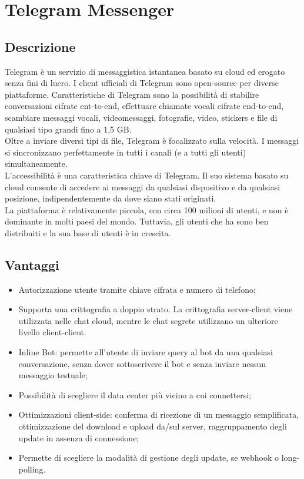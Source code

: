 \documentclass[11pt,notitlepage]{article}
\begin{document}
\bigskip
\section*{Telegram Messenger}
\subsection*{Descrizione}
Telegram è un servizio di messaggistica istantanea basato su cloud ed erogato senza fini di lucro. I client ufficiali di Telegram sono open-source per diverse piattaforme. Caratteristiche di Telegram sono la possibilità di stabilire conversazioni cifrate ent-to-end, effettuare chiamate vocali cifrate end-to-end, scambiare messaggi vocali, videomessaggi, fotografie, video, stickers e file di qualsiasi tipo grandi fino a 1,5 GB.  \\
Oltre a inviare diversi tipi di file, Telegram è focalizzato sulla velocità. I messaggi si sincronizzano perfettamente in tutti i canali (e a tutti gli utenti) simultaneamente. \\
L'accessibilità è una caratteristica chiave di Telegram. Il suo sistema basato su cloud consente di accedere ai messaggi da qualsiasi dispositivo e da qualsiasi posizione, indipendentemente da dove siano stati originati. \\
La piattaforma è relativamente piccola, con circa 100 milioni di utenti, e non è dominante in molti paesi del mondo. Tuttavia, gli utenti che ha sono ben distribuiti e la sua base di utenti è in crescita.

\subsection*{Vantaggi}
\begin{itemize}
		\item Autorizzazione utente tramite chiave cifrata e numero di telefono;
		\item Supporta una crittografia a doppio strato. La crittografia server-client viene utilizzata nelle chat cloud, mentre le chat segrete utilizzano un ulteriore livello client-client. 
		\item Inline Bot: permette all'utente di inviare query al bot da una qualsiasi conversazione, senza dover sottoscrivere il bot e senza inviare nessun messaggio testuale;
		\item Possibilità di scegliere il data center più vicino a cui connettersi;
		\item Ottimizzazioni client-side: conferma di ricezione di un messaggio semplificata, ottimizzazione del download e upload da/sul server, raggruppamento degli update in assenza di connessione;
		\item Permette di scegliere la modalità di gestione degli update, se webhook o long-polling.
\end{itemize} 
\end{document}
